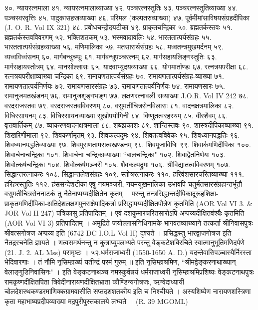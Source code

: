 ४०. न्यायरत्नमाला
४१. न्यायरत्नमालाव्याख्या
४२. पञ्चरत्नस्तुतिः
४३. पञ्चरत्नस्तुतिव्याख्या
४४. पञ्चस्वरवृत्तिः
४५. पादुकासहस्रव्याख्या
४६. परिमल (कल्पतरुव्याख्या)
४७. पूर्वमीमांसाविषयसंग्रहदीपिका (J. O. R. Vol IX 321)
४८. प्रबोधचन्द्रोदयटीका
४९. प्राकृतचन्द्रिका
५०. ब्रह्मतर्कस्तवः 
५१. ब्रह्मतर्कस्तवविवरणम्
५२. भक्तिशतकम्
५३. भस्मवादावलिः
५४. भारततात्पर्यसंग्रहः
५५. भारततात्पर्यसंग्रहव्याख्या
५६. मणिमालिका
५७. मतसारार्थसंग्रहः
५८. मध्वतन्त्रमुखमर्दनम्
५९. व्यध्वविध्वंसनम्
६०. मार्गबन्धुच्म्पूः
६१. मार्गबन्धुपञ्चरत्नम् 
६२. मार्गसहायलिङ्गस्तुतिः
६३. मार्गसहायस्तोत्रम्
६४. मानसोल्लासः
६५. यादवाभ्युदयव्याख्या
६६. योगमार्ताण्डः
६७. रत्नत्रयपरीक्षा
६८. रत्नत्रयपरीक्षाव्याख्या चन्द्रिका
६९. रामायणतात्पर्यसंग्रहः
७०. रामायणतात्पर्यसंग्रह-व्याख्या
७१. रामायणतात्पर्यनिर्णयः
७२. रामायणसारसंग्रहः
७३. रामायणतात्पर्यनिर्णयः
७४. रामायणसारः
७५. रामानुजमतखंडनम्
७६. रामानुजशृङ्गभङ्ग
७७. लक्षणरत्नावली सव्याख्या J.O.R. Vol IV 242
७८. वरदराजस्तवः
७९. वरदराजस्तवविवरणम्
८०. वसुमतीचित्रसेनविलासः
८१. वादनक्षत्रमालिका
८२. विधिरसायनम्
८३. विधिरसायनव्याख्या सुखोपयोगिनी
८४. विष्णुतत्वरहस्यम्
८५. वीरशैवम्
८६. वृत्तवार्तिकम् 
८७. व्याकरणवादनक्षत्रमाला
८८. शब्दप्रकाशः
८९. शान्तिस्तवः
९०. शास्त्रदीपिकाव्याख्या
९१. शिखरिणीमाला
९२. शिवकर्णामृतम्
९३. शिवकल्पदुमः
९४. शिवतत्वविवेकः
९५. शिवध्यानपद्धतिः
९६. शिवध्यानपद्धतिव्याख्या
९७. शिवपुराणतामसत्वखण्डनम्
९८. शिवपूजाविधिः
९९. शिवार्कमणिदीपिका
१००. शिवार्चनाचन्द्रिका
१०१. शिवार्चना चन्द्रिकाव्याख्या ``बालचन्द्रिका"
१०२. शिवाद्वैतनिर्णयः
१०३. शिवोत्कर्षचन्द्रिका
१०४. शिवोत्कर्षमञ्जरी
१०५. शैवकल्पद्रुमः
१०६. श्रीविद्यातत्वविवरणम्
१०७. सिद्धान्तरत्नाकरः
१०८. सिद्धान्तलेशसंग्रहः
१०९. स्तोत्ररत्नाकरः
११०. हरिवंशसारचरितव्याख्या
१११. हरिहरस्तुतिः 
११२. हंससन्देशटीका
एषु नयमञ्जरी, नयमयूखमालिका उभावपि चतुर्मतसारसंग्रहान्तर्भूतौ वसुमतीचित्रसेननाटकं तु नैतेनाप्पय्यदीक्षितेन कृतम् । परन्तु तन्त्रसिद्धान्तदीपिकादूरूहशिक्षा-प्राकृतमणिदीपिका-अतिदेशलक्षणपुनराक्षेपादिकर्त्रा प्रसिद्धापय्यदीक्षितपौत्रेण कृतमिति (AOR Vol VI 3. & JOR Vol II 247) पत्रिकासु प्रतिपादितम् । एवं दशकुमारचरितसारोऽपि अप्पय्यदीक्षितवंश्यैः कृतमिति (AOR Vol VI 3) प्रतिपादितम् । अमुद्रिते जयोल्लासनिधिनामके भागवतव्याख्याने तत्कर्ता श्रीनिवासपुत्रः श्रीवत्सगोत्रज अप्पय्य इति (6742 DC I.O.L Vol II) दृश्यते । प्रसिद्धस्तु भारद्वाजगोत्रज इति नैतद्ररचनेति ज्ञायते ।
णत्वसमर्थनन्तु न कुत्राप्युपलभ्यते परन्तु वेङ्कटेशबिरचिते स्वात्मानुभूतिमणिदर्पणे (21. J. 2. AL Mss) परामृष्टः ।
५२.धर्मराजाध्वरी (1550-1650 A. D.)
यदन्तेवासिपञ्चास्यैर्निरस्ता भेदिवारणाः । तं नौमि नृसिम्हाख्यं यतीन्द्रं परमं गुरुम् ॥ इति नृसिम्हाश्रमिण, ``श्रीमद्वेङ्करनाथाख्यान् वेलाङ्गुडिनिवासिनः" । इति वेङ्कटनाथञ्च नमस्कुर्वन्नयं धर्मराजाध्वरी नृसिम्हाश्रमिप्रशिष्यः वेङ्कटनाथपुत्रः रामकृष्णदीक्षितपिता त्रिवेदीनारायणदीक्षितभ्राता कौण्डिन्यगोत्रजः, ऋग्वेदाध्यायी चोलदेशस्थकण्डरमाणिक्कग्रामवासीति सप्तदशशतकीय इति च निश्चीयते । अस्यशिष्येण नारायणशस्त्रिणा कृता महाभाष्यप्रदीपव्याख्या मद्रपुरीपुस्तकालये लभ्यते । (R. 39 MGOML)
